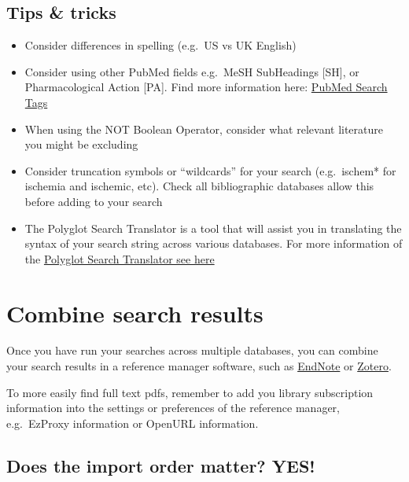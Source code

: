 \documentclass[
]{book}
\providecommand{\tightlist}{%
  \setlength{\itemsep}{0pt}\setlength{\parskip}{0pt}}
\begin{document}
\hypertarget{tips-tricks}{%
\subsection{Tips \& tricks}\label{tips-tricks}}

\begin{itemize}
\tightlist
\item
  Consider differences in spelling (e.g.~US vs UK English)
\item
  Consider using other PubMed fields e.g.~MeSH SubHeadings {[}SH{]}, or Pharmacological Action {[}PA{]}. Find more information here: \href{https://pubmed.ncbi.nlm.nih.gov/help/\#search-tags}{PubMed Search Tags}
\item
  When using the NOT Boolean Operator, consider what relevant literature you might be excluding
\item
  Consider truncation symbols or ``wildcards'' for your search (e.g.~ischem* for ischemia and ischemic, etc). Check all bibliographic databases allow this before adding to your search
\item
  The Polyglot Search Translator is a tool that will assist you in translating the syntax of your search string across various databases. For more information of the \href{https://sr-accelerator.com/\#/polyglot}{Polyglot Search Translator see here}
\end{itemize}

\hypertarget{combine-search-results}{%
\section{Combine search results}\label{combine-search-results}}

Once you have run your searches across multiple databases, you can combine your search results in a reference manager software, such as \href{https://endnote.com/}{EndNote} or \href{https://www.zotero.org/}{Zotero}.

To more easily find full text pdfs, remember to add you library subscription information into the settings or preferences of the reference manager, e.g.~EzProxy information or OpenURL information.

\hypertarget{does-the-import-order-matter-yes}{%
\subsection{Does the import order matter? YES!}\label{does-the-import-order-matter-yes}}
\end{document}
